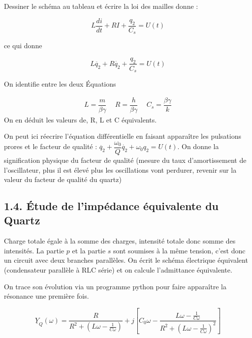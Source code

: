 \documentclass[french, a4paper, 10pt, twocolumn, landscape]{article}
\begin{document}
Dessiner le schéma au tableau et écrire la loi des mailles donne :

\begin{equation}
    L\dfrac{di}{dt}+RI+\dfrac{q_2}{C_s}=U(t)
\end{equation}

ce qui donne 

\begin{equation}
    L\ddot{q_2}+R\dot{q_2}+\dfrac{q_2}{C_s}=U(t)
\end{equation}

On identifie entre les deux Équations

\begin{equation}
    \begin{array}{lll}
        
    L = \dfrac{m}{\beta\gamma}&~~ R=\dfrac{h}{\beta\gamma}&~~C_s=\dfrac{\beta\gamma}{k} 
    \end{array}
\end{equation}
On en déduit les valeurs de, R, L et C équivalents.


On peut ici réecrire l'équation différentielle en faisant apparaître les pulsations prores et le facteur de qualité : $\ddot{q_2}+\dfrac{\omega_0}{Q}\dot{q_2}+\omega_0q_2=U(t)$.  On donne la signification physique du facteur de qualité (mesure du taux d'amortissement de l'oscillateur, plus il est élevé plus les oscillations vont perdurer, revenir sur la valeur du facteur de qualité du quartz)
\subsection*{1.4. Étude de l'impédance équivalente du Quartz}

Charge totale égale à la somme des charges, intensité totale donc somme des intensités. La partie $p$ et la partie $s$ sont soumises à la même tension, c'est donc un circuit avec deux branches parallèles. On écrit le schéma électrique équivalent (condensateur parallèle à RLC série) et on calcule l'admittance équivalente.\medskip

On trace son évolution via un programme python pour faire apparaître la résonance une première fois.

\begin{equation}
    \underline{Y}_Q(\omega) = \dfrac{R}{R^2+\left(L\omega-\frac{1}{C\omega}\right)}+j\left[C_0\omega-\dfrac{L\omega-\frac{1}{C\omega}}{R^2+\left(L\omega-\frac{1}{C\omega}\right)^2}\right]
\end{equation}
\end{document}
